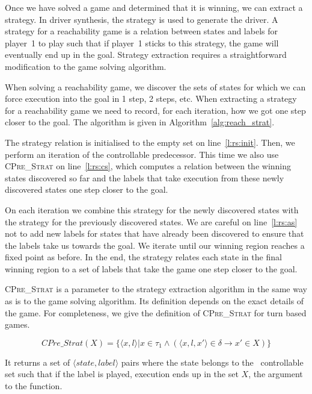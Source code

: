 Once we have solved a game and determined that it is winning, we can extract a strategy. In driver synthesis, the strategy is used to generate the driver. A strategy for a reachability game is a relation between states and labels for player~1 to play such that if player~1 sticks to this strategy, the game will eventually end up in the goal. Strategy extraction requires a straightforward modification to the game solving algorithm.

When solving a reachability game, we discover the sets of states for which we can force execution into the goal in 1 step, 2 steps, etc. When extracting a strategy for a reachability game we need to record, for each iteration, how we got one step closer to the goal. The algorithm is given in Algorithm~\ref{alg:reach_strat}. 

The strategy relation is initialised to the empty set on line~\ref{l:rs:init}. Then, we perform an iteration of the controllable predecessor. This time we also use \textsc{CPre\_Strat} on line~\ref{l:rs:cs}, which computes a relation between the winning states discovered so far and the labels that take execution from these newly discovered states one step closer to the goal.

On each iteration we combine this strategy for the newly discovered states with the strategy for the previously discovered states. We are careful on line~\ref{l:rs:as} not to add new labels for states that have already been discovered to ensure that the labels take us towards the goal. We iterate until our winning region reaches a fixed point as before. In the end, the strategy relates each state in the final winning region to a set of labels that take the game one step closer to the goal.

\textsc{CPre\_Strat} is a parameter to the strategy extraction algorithm in the same way as \textsc{\cpre} is to the game solving algorithm. Its definition depends on the exact details of the game. For completeness, we give the definition of \textsc{CPre\_Strat} for turn based games. 

\begin{equation}
    CPre\_Strat(X) = \{\langle x, l \rangle | x \in \tau_1 \wedge (\langle x, l, x' \rangle \in \delta \rightarrow x' \in X)\}
\end{equation}

It returns a set of $\langle state, label \rangle$ pairs where the state belongs to the \pone\ controllable set such that if the label is played, execution ends up in the set $X$, the argument to the function.

